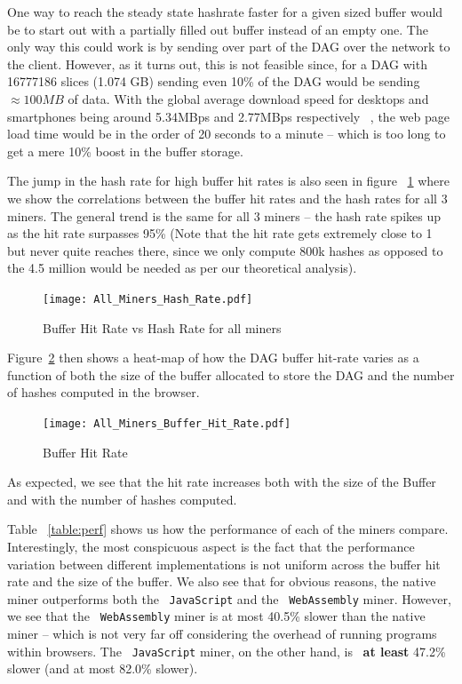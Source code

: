 \documentclass[runningheads]{llncs}
\begin{document}
One way to reach the steady state hashrate faster for a given sized buffer would be to start out with a partially filled out buffer instead of an empty one. The only way this could work is by sending over part of the DAG over the network to the client. However, as it turns out, this is not feasible since, for a DAG with 16777186 slices (1.074 GB) sending even 10\% of the DAG would be sending $\approx100MB$ of data. With the global average download speed for desktops and smartphones being around 5.34MBps and 2.77MBps respectively ~\cite{internetSpeed}, the web page load time would be in the order of 20 seconds to a minute -- which is too long to get a mere 10\% boost in the buffer storage. 

The jump in the hash rate for high buffer hit rates is also seen in figure ~\ref{fig:bufferRatevsHashRate} where we show the correlations between the buffer hit rates and the hash rates for all 3 miners. The general trend is the same for all 3 miners -- the hash rate spikes up as the hit rate surpasses 95\% (Note that the hit rate gets extremely close to 1 but never quite reaches there, since we only compute 800k hashes as opposed to the 4.5 million would be needed as per our theoretical analysis).

\begin{figure}[h]
\centering
\texttt{[image: All\_Miners\_Hash\_Rate.pdf]}
\caption{\label{fig:bufferRatevsHashRate} Buffer Hit Rate vs Hash Rate for all miners}
\end{figure}

Figure~\ref{fig:bufferRateHM} then shows a heat-map of how the DAG buffer hit-rate varies as a function of both the size of the buffer allocated to store the DAG and the number of hashes computed in the browser. 

\begin{figure}[H]
\centering
\texttt{[image: All\_Miners\_Buffer\_Hit\_Rate.pdf]}
\caption{\label{fig:bufferRateHM} Buffer Hit Rate}
\end{figure}

As expected, we see that the hit rate increases both with the size of the Buffer and with the number of hashes computed.

Table ~\ref{table:perf} shows us how the performance of each of the miners compare. Interestingly, the most conspicuous aspect is the fact that the performance variation between different implementations is not uniform across the buffer hit rate and the size of the buffer. We also see that for obvious reasons, the native miner outperforms both the ~\verb|JavaScript| and the ~\verb|WebAssembly| miner. However, we see that the ~\verb|WebAssembly| miner is at most 40.5\% slower than the native miner -- which is not very far off considering the overhead of running programs within browsers. The ~\verb|JavaScript| miner, on the other hand, is ~\textbf{at least} 47.2\% slower (and at most 82.0\% slower).
\end{document}
